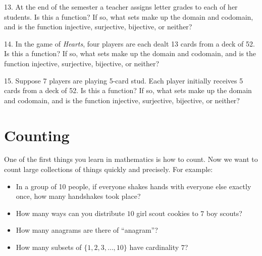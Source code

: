 \documentclass[10pt,]{book}
\theoremstyle{plain}
\theoremstyle{definition}
\theoremstyle{definition}
\theoremstyle{definition}
\numberwithin{equation}{section}
\begin{document}
\begin{exerciselist}
\par\smallskip
\item[13.]\hypertarget{exercise-39}{}
            At the end of the semester a teacher assigns letter grades to each of her students. Is this a function? If so, what sets make up the domain and codomain, and is the function injective, surjective, bijective, or neither?
\par\smallskip
\item[14.]\hypertarget{exercise-40}{}
            In the game of \emph{Hearts}, four players are each dealt 13 cards from a deck of 52. Is this a function? If so, what sets make up the domain and codomain, and is the function injective, surjective, bijective, or neither?
\par\smallskip
\item[15.]\hypertarget{exercise-41}{}
            Suppose 7 players are playing 5-card stud. Each player initially receives 5 cards from a deck of 52. Is this a function? If so, what sets make up the domain and codomain, and is the function injective, surjective, bijective, or neither?
\par\smallskip
\end{exerciselist}
\typeout{************************************************}
\typeout{************************************************}
\chapter[Counting]{Counting}\label{ch_counting}
\typeout{************************************************}
\typeout{************************************************}

One of the first things you learn in mathematics is how to count. Now we want to count large collections of things quickly and precisely. For example:
%
\leavevmode%
\begin{itemize}[label=\textbullet]
\item{}
In a group of 10 people, if everyone shakes hands with everyone else exactly once, how many handshakes took place?
%
\item{}
How many ways can you distribute \(10\) girl scout cookies to \(7\) boy scouts?
%
\item{}
How many anagrams are there of ``anagram''?
%
\item{}
How many subsets of \(\{1,2,3,\ldots, 10\}\) have cardinality \(7\)?
%
\end{itemize}
\par
\end{document}
